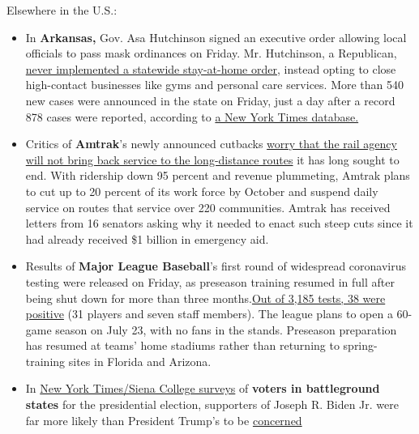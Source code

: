 Elsewhere in the U.S.:

\begin{itemize}
\item
  In \textbf{Arkansas,} Gov. Asa Hutchinson signed an executive order
  allowing local officials to pass mask ordinances on Friday. Mr.
  Hutchinson, a Republican,
  \href{https://www.nytimes3xbfgragh.onion/interactive/2020/us/states-reopen-map-coronavirus.html}{never
  implemented a statewide stay-at-home order}, instead opting to close
  high-contact businesses like gyms and personal care services. More
  than 540 new cases were announced in the state on Friday, just a day
  after a record 878 cases were reported, according to
  \href{https://www.nytimes3xbfgragh.onion/interactive/2020/us/arkansas-coronavirus-cases.html}{a
  New York Times database.}
\item
  Critics of \textbf{Amtrak}'s newly announced cutbacks
  \href{https://www.nytimes3xbfgragh.onion/2020/07/03/us/coronavirus-amtrak-cuts.html}{worry
  that the rail agency will not bring back service to the long-distance
  routes} it has long sought to end. With ridership down 95 percent and
  revenue plummeting, Amtrak plans to cut up to 20 percent of its work
  force by October and suspend daily service on routes that service over
  220 communities. Amtrak has received letters from 16 senators asking
  why it needed to enact such steep cuts since it had already received
  \$1 billion in emergency aid.
\item
  Results of \textbf{Major League Baseball}'s first round of widespread
  coronavirus testing were released on Friday, as preseason training
  resumed in full after being shut down for more than three
  months.\href{https://www.nytimes3xbfgragh.onion/2020/07/03/sports/baseball/mlb-workouts-first-practices-boston-red-sox.html}{Out
  of 3,185 tests, 38 were positive} (31 players and seven staff
  members). The league plans to open a 60-game season on July 23, with
  no fans in the stands. Preseason preparation has resumed at teams'
  home stadiums rather than returning to spring-training sites in
  Florida and Arizona.
\item
  In
  \href{https://www.nytimes3xbfgragh.onion/2020/06/25/upshot/poll-2020-biden-battlegrounds.html}{New
  York Times/Siena College surveys} of \textbf{voters in battleground
  states} for the presidential election, supporters of Joseph R. Biden
  Jr. were far more likely than President Trump's to be
  \href{https://www.nytimes3xbfgragh.onion/2020/07/03/upshot/biden-supporters-are-more-worried-about-the-health-risks-of-voting.html}{concerned
}
\end{itemize}
